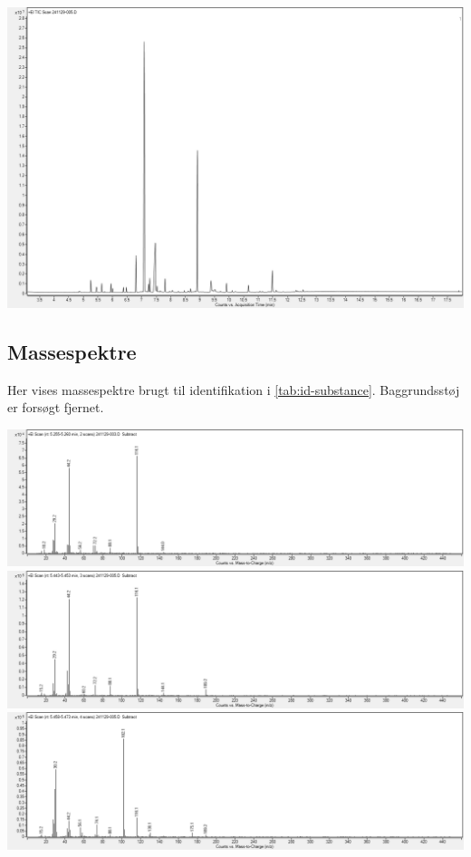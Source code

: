 \includegraphics[width=1\linewidth]{graphics/data/GC/241129-005.png}
\newpage\subsection{Massespektre}
Her vises massespektre brugt til identifikation i \cref{tab:id-substance}. Baggrundsstøj er forsøgt fjernet.\par
\includegraphics[width=1\linewidth]{graphics/data/MS/05255.png}
\includegraphics[width=1\linewidth]{graphics/data/MS/05448.png}
\includegraphics[width=1\linewidth]{graphics/data/MS/05463.png}
